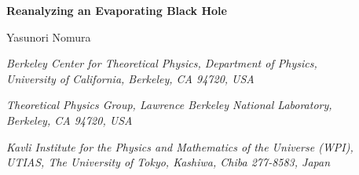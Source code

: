\documentclass[12pt]{article}
\begin{document}
\baselineskip 0.6cm

\def\bra#1{\langle #1 |}
\def\ket#1{| #1 \rangle}
\def\inner#1#2{\langle #1 | #2 \rangle}
\def\brac#1{\llangle #1 \|}
\def\ketc#1{\| #1 \rrangle}
\def\innerc#1#2{\llangle #1 \| #2 \rrangle}
\def\app#1#2{%
  \mathrel{%
    \setbox0=\hbox{$#1\sim$}%
    \setbox2=\hbox{%
      \rlap{\hbox{$#1\propto$}}%
      \lower1.1\ht0\box0%
    }%
    \raise0.25\ht2\box2%
  }%
}
\def\approxprop{\mathpalette\app\relax}
\DeclarePairedDelimiter{\norm}{\lVert}{\rVert}

\begin{titlepage}

\begin{flushright}
\end{flushright}

\vskip 1.2cm

\begin{center}
{\Large \bf Reanalyzing an Evaporating Black Hole}

\vskip 0.7cm

{\large Yasunori Nomura}

\vskip 0.5cm

{\it Berkeley Center for Theoretical Physics, Department of Physics,\\
  University of California, Berkeley, CA 94720, USA}

\vskip 0.1cm

{\it Theoretical Physics Group, Lawrence Berkeley National Laboratory,\\
 Berkeley, CA 94720, USA}

\vskip 0.1cm

{\it Kavli Institute for the Physics and Mathematics of the Universe 
 (WPI),\\
 UTIAS, The University of Tokyo, Kashiwa, Chiba 277-8583, Japan}

\vskip 0.7cm


\end{center}
\end{titlepage}
\end{document}
